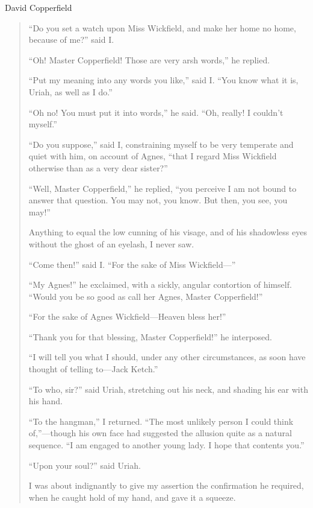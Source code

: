 \begin{texts}{David Copperfield}
\begin{quote}
    ``Do you set a watch upon Miss Wickfield, and make her home no home, because of me?'' said I.
    
    ``Oh! Master Copperfield! Those are very arsh words,'' he replied.
    
    ``Put my meaning into any words you like,'' said I. ``You know what it is, Uriah, as well as I do.''
    
    ``Oh no! You must put it into words,'' he said. ``Oh, really! I couldn't myself.''
    
    ``Do you suppose,'' said I, constraining myself to be very temperate and quiet with him, on account of Agnes, ``that I regard Miss Wickfield otherwise than as a very dear sister?''
    
    ``Well, Master Copperfield,'' he replied, ``you perceive I am not bound to answer that question. You may not, you know. But then, you see, you may!''
    
    Anything to equal the low cunning of his visage, and of his shadowless eyes without the ghost of an eyelash, I never saw.
    
    ``Come then!'' said I. ``For the sake of Miss Wickfield—''
    
    ``My Agnes!'' he exclaimed, with a sickly, angular contortion of himself. ``Would you be so good as call her Agnes, Master Copperfield!''
    
    ``For the sake of Agnes Wickfield—Heaven bless her!''
    
    ``Thank you for that blessing, Master Copperfield!'' he interposed.
    
    ``I will tell you what I should, under any other circumstances, as soon have thought of telling to—Jack Ketch.''
    
    ``To who, sir?'' said Uriah, stretching out his neck, and shading his ear with his hand.
    
    ``To the hangman,'' I returned. ``The most unlikely person I could think of,''—though his own face had suggested the allusion quite as a natural sequence. ``I am engaged to another young lady. I hope that contents you.''
    
    ``Upon your soul?'' said Uriah.
    
    I was about indignantly to give my assertion the confirmation he required, when he caught hold of my hand, and gave it a squeeze.
\end{quote}


\end{texts}

